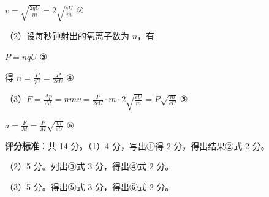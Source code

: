 \documentclass[\gkver]{gaokaozhenti}
\begin{document}
\begin{enumerate}
{$v = \sqrt{\frac{2qU}{m}} = 2\sqrt{\frac{eU}{m}}$                                                ②

（2）设每秒钟射出的氧离子数为 $n$，有

$P = nqU$                                                ③

得 $n = \frac{P}{qU} = \frac{P}{2eU}$                                                ④

（3）$F = \frac{\Delta p}{\Delta t} = nmv = \frac{P}{2eU}\cdot m\cdot 2\sqrt{\frac{eU}{m}} = P\sqrt{\frac{m}{eU}}$                                                ⑤

$a = \frac{F}{M} = \frac{P}{M}\sqrt{\frac{m}{eU}}$                                                ⑥

\textbf{评分标准}：共 14 分。（1）4 分，写出①得 2 分，得出结果②式 2 分。

（2）5 分。列出③式 3 分，得出④式 2 分。

（3）5 分。得出⑤式 3 分，得出⑥式 2 分。
}

\end{enumerate}
\end{document}
